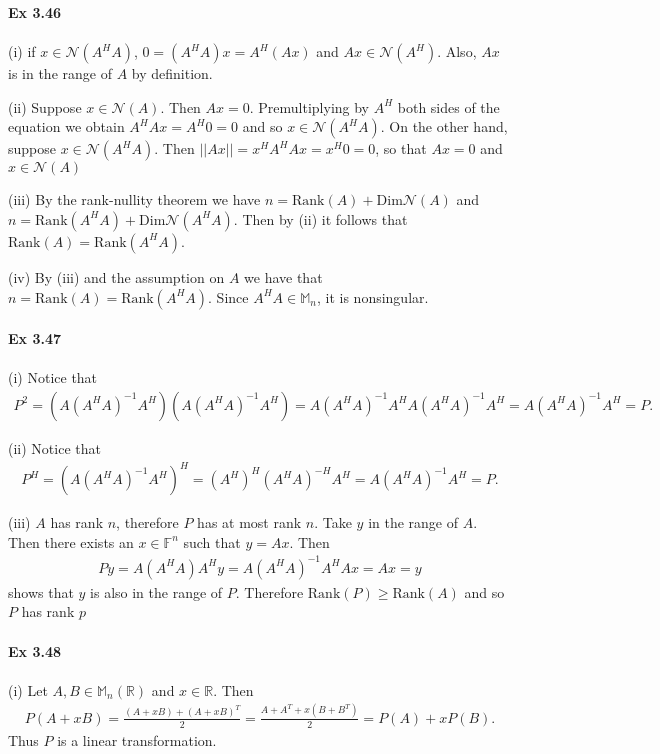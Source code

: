 \documentclass[letterpaper,12pt]{article}
\theoremstyle{definition}
\begin{document}
\begin{spacing}{1.3}{}
	\textbf{Ex 3.46} \\\\
	(i)
	if $x\in\mathcal N(A^HA)$, $0=(A^HA)x=A^H(Ax)$ and $Ax\in\mathcal N(A^H)$.
	Also, $Ax$ is in the range of $A$ by definition.
	
	(ii)
	Suppose $x\in\mathcal N(A)$.
	Then $Ax=0$.
	Premultiplying by $A^H$ both sides of the equation we obtain $A^HAx=A^H0=0$
	and so $x\in\mathcal N(A^HA)$.
	On the other hand, suppose $x\in\mathcal N(A^HA)$.
	Then $||Ax||=x^HA^HAx=x^H0=0$, so that $Ax=0$ and $x\in\mathcal N(A)$
	
	(iii)
	By the rank-nullity theorem we have $n=\text{Rank}(A)+\text{Dim}\mathcal N(A)$
	and $n=\text{Rank}(A^HA)+\text{Dim}\mathcal N(A^HA)$.
	Then by (ii) it follows that $\text{Rank}(A)=\text{Rank}(A^HA)$.
	
	(iv)
	By (iii) and the assumption on $A$ we have that $n=\text{Rank}(A)=\text{Rank}(A^HA)$.
	Since $A^HA\in\mathbb M_n$, it is nonsingular.\\\\
	
	\textbf{Ex 3.47} \\\\
	(i)
	Notice that
	\begin{align*}
	P^2=(A(A^HA)^{-1}A^H)(A(A^HA)^{-1}A^H)=
	A(A^HA)^{-1}A^HA(A^HA)^{-1}A^H=
	A(A^HA)^{-1}A^H=P.
	\end{align*}
	
	(ii)
	Notice that
	\begin{align*}
	P^H=(A(A^HA)^{-1}A^H)^H=
	(A^H)^H(A^HA)^{-H}A^H=A(A^HA)^{-1}A^H=P.
	\end{align*}
	
	(iii)
	$A$ has rank $n$, therefore $P$ has at most rank $n$.
	Take $y$ in the range of $A$.
	Then there exists an $x\in\mathbb F^n$ such that $y=Ax$.
	Then
	\begin{align*}
	Py=A(A^HA)A^Hy=A(A^HA)^{-1}A^HAx=Ax=y
	\end{align*}
	shows that $y$ is also in the range of $P$.
	Therefore $\text{Rank}(P)\geq\text{Rank}(A)$ and so $P$ has rank $p$ \\\\
	
	\textbf{Ex 3.48} \\\\
	(i)
	Let $A,B\in\mathbb M_n(\mathbb R)$ and $x\in\mathbb R$.
	Then
	\begin{align*}
	P(A+xB)=\frac{(A+xB)+(A+xB)^T}{2}=
	\frac{A+A^T+x(B+B^T)}{2}=P(A)+xP(B).
	\end{align*}
	Thus $P$ is a linear transformation.
	

\end{spacing}
\end{document}

